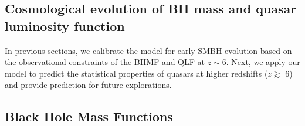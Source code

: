 \documentclass[twocolumn, twocolappendix]{aastex63}
\begin{document}
\begin{CJK*}{UTF8}{gbsn}
\vspace{2mm}
\section{Cosmological evolution of BH mass and quasar luminosity function}\label{sec:cosm}


In previous sections, we calibrate the model for early SMBH evolution based on the observational constraints of the BHMF and QLF at $z\sim6$.
Next, we apply our model to predict the statistical properties of quasars at higher redshifts ($z\gtrsim$ 6)
and provide prediction for future explorations.

\subsection{Black Hole Mass Functions}



\end{CJK*}
\end{document}
